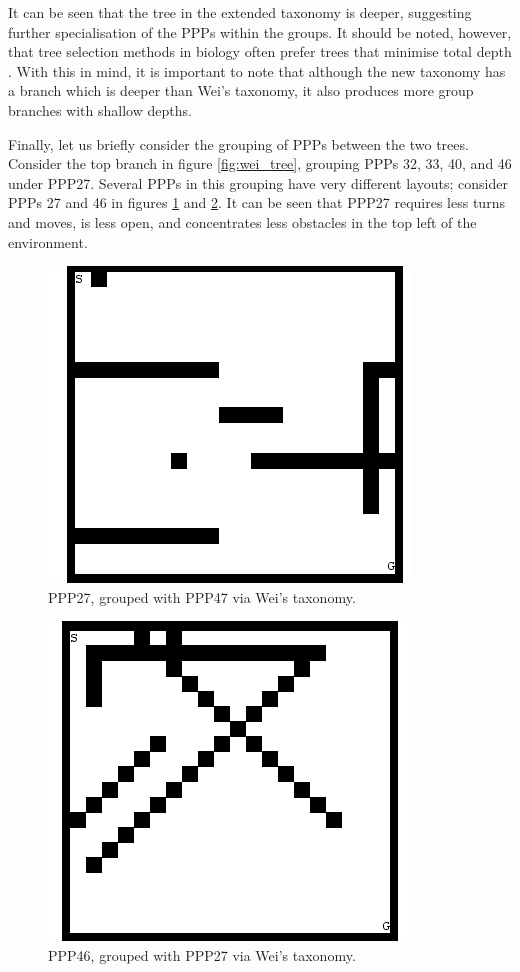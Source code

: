 \documentclass[authoryearcitations]{UoYCSproject}
\begin{document}
It can be seen that the tree in the extended taxonomy is deeper, suggesting further specialisation of the PPPs within the groups. It should be noted, however, that tree selection methods in biology often prefer trees that minimise total depth \cite[chapter 11 p.415]{phylo}. With this in mind, it is important to note that although the new taxonomy has a branch which is deeper than Wei's taxonomy, it also produces more group branches with shallow depths.

Finally, let us briefly consider the grouping of PPPs between the two trees. Consider the top branch in figure \ref{fig:wei_tree}, grouping PPPs 32, 33, 40, and 46 under PPP27. Several PPPs in this grouping have very different layouts; consider PPPs 27 and 46 in figures \ref{fig:ppp_27} and \ref{fig:ppp_46}. It can be seen that PPP27 requires less turns and moves, is less open, and concentrates less obstacles in the top left of the environment.

\begin{figure}
\graphicspath{ {EvalPics/} }
\includegraphics[scale=0.65]{ppp27.png}
\caption{PPP27, grouped with PPP47 via Wei's taxonomy.}
\label{fig:ppp_27}
\end{figure}

\begin{figure}
\graphicspath{ {EvalPics/} }
\includegraphics[scale=0.65]{ppp46.png}
\caption{PPP46, grouped with PPP27 via Wei's taxonomy.}
\label{fig:ppp_46}
\end{figure}
\end{document}

